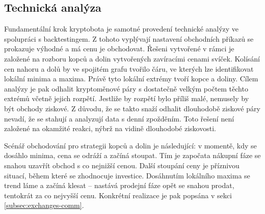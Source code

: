 \subsection{Technická analýza}
Fundamentální krok kryptobota je samotné provedení technické analýzy ve spolupráci s backtestingem. Z tohoto vyplývají nastavení obchodních příkazů se prokazuje výhodné
a má cenu je obchodovat. Řešeni vytvořené v rámci je založené na rozboru kopců a dolin vytvořených zavíracími cenami svíček. Kolísání cen nahoru a dolů by ve spojitém grafu
tvořilo čáru, ve kterých lze identifikovat lokální minima a maxima. Právě tyto lokální extrémy tvoří kopce a doliny. Cílem analýzy je pak odhalit kryptoměnové páry s dostatečně
velkým počtem těchto extrémů včetně jejich rozpětí. Jestliže by rozpětí bylo příliš malé, nemusely by být obchody ziskové. Z důvodu, že se takto snaží odhalit dlouhodobě
ziskové páry nevadí, že se stahují a analyzují data s denní zpožděním. Toto řešení není založené na okamžité reakci, nýbrž na vidině dlouhodobé ziskovosti.

Scénář obchodování pro strategii kopců a dolin je následující: v momentě, kdy se dosáhlo minima, cena se odráží a začíná stoupat. Tím je započata nákupní fáze
se snahou uzavřít obchod s co nejnižší cenou. Další stoupání ceny je příznivou situací, během které se zhodnocuje investice. Dosáhnutím lokálního maxima se trend láme a začíná klesat
-- nastává prodejní fáze opět se snahou prodat, tentokrát za co nejvyšší cenu. Konkrétní realizace je pak popsána v sekci \ref{subsec:exchanges-comm}.


